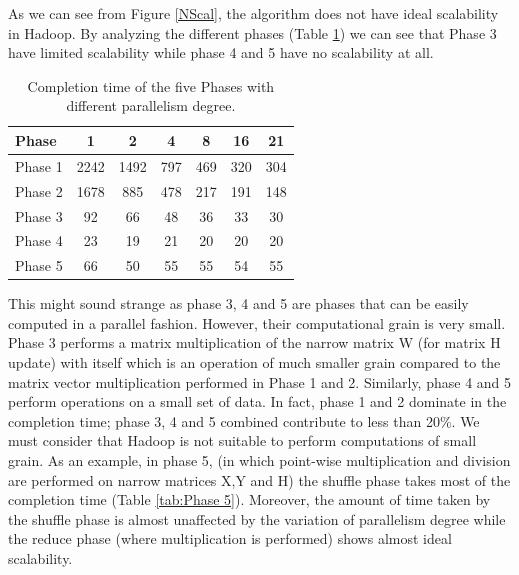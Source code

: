 As we can see from Figure \ref{NScal}, the algorithm does not have ideal scalability in Hadoop.
By analyzing the different phases (Table \ref{tab:differentPhases}) we can see that Phase 3 have limited scalability while phase 4 and 5 have no scalability at all.
\begin{table}[h!]
\begin{center}
\begin{tabular}{ | l || c | c | c | c |  c | c | }

  \hline      
  Phase & 1 & 2 & 4 & 8 &16 & 21 \\
  \hline      
  Phase 1 & 2242 	& 1492 & 797 	& 469 	& 320 	& 304\\
  Phase 2 & 1678 	& 885 	& 478	& 217 	& 191 	& 148\\
  Phase 3 & 92 		& 66 	& 48 	& 36 	& 33 	& 30\\ 
  Phase 4 & 23 		& 19 	& 21 	& 20 	& 20 	& 20\\
  Phase 5 & 66 		& 50 	& 55 	& 55 	& 54 	& 55\\
  \hline  


\end{tabular} 
  \end{center}
  \caption{Completion time of the five Phases with different parallelism degree.}
    \label{tab:differentPhases}
\end{table}
This might sound strange as phase 3, 4 and 5 are phases that can be easily computed in a parallel fashion.
However, their computational grain is very small.
Phase 3 performs a matrix multiplication of the narrow matrix W (for matrix H update) with itself which is an operation of much smaller grain compared to the matrix vector multiplication performed in Phase 1 and 2. 
Similarly, phase 4 and 5 perform operations on a small set of data.
In fact, phase 1 and 2 dominate in the completion time; phase 3, 4 and 5 combined contribute to less than 20\%.
We must consider that Hadoop is not suitable to perform computations of small grain.
As an example, in phase 5, (in which point-wise multiplication and division are performed on narrow matrices X,Y and H)  the shuffle phase takes most of the completion time (Table \ref{tab:Phase 5}). 
Moreover, the amount of time taken by the shuffle phase is almost unaffected by the variation of parallelism degree while the reduce phase (where multiplication is performed) shows almost ideal scalability.
 
